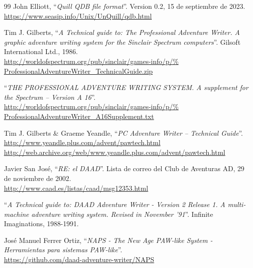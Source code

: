 \documentclass[11pt, a5paper]{article}
\begin{document}
\begin{thebibliography}{99}
  John Elliott,
  ``\emph{Quill QDB file format}''.
  Version 0.2,
  15 de septiembre de 2023.\\
  \url{https://www.seasip.info/Unix/UnQuill/qdb.html}

  Tim J. Gilberts,
  ``\emph{A Technical guide to: The Professional Adventure Writer. A graphic
  adventure writing system for the Sinclair Spectrum computers}''.
  Gilsoft International Ltd.,
  1986.\\
  \url{http://worldofspectrum.org/pub/sinclair/games-info/p/%
       ProfessionalAdventureWriter_TechnicalGuide.zip}

  ``\emph{THE PROFESSIONAL ADVENTURE WRITING SYSTEM. A supplement for the
  Spectrum -- Version A 16}''.\\
  \url{http://worldofspectrum.org/pub/sinclair/games-info/p/%
       ProfessionalAdventureWriter_A16Supplement.txt}

  Tim J. Gilberts \& Graeme Yeandle,
  ``\emph{PC Adventure Writer -- Technical Guide}''.\\
  \url{http://www.yeandle.plus.com/advent/pawtech.html}\\
  \url{http://web.archive.org/web/www.yeandle.plus.com/advent/pawtech.html}

  Javier San José,
  ``\emph{RE: el DAAD}''.
  Lista de correo del Club de Aventuras AD,
  29 de noviembre de 2002.\\
  \url{http://www.caad.es/listas/caad/msg12353.html}

  ``\emph{A Technical guide to: DAAD Adventure Writer - Version 2 Release 1. A multi-machine adventure writing system. Revised in November '91}''.
  Infinite Imaginations,
  1988-1991.

  José Manuel Ferrer Ortiz,
  ``\emph{NAPS - The New Age PAW-like System - Herramientas para sistemas PAW-like}''.\\
  \url{https://github.com/daad-adventure-writer/NAPS}

\end{thebibliography}
\end{document}
